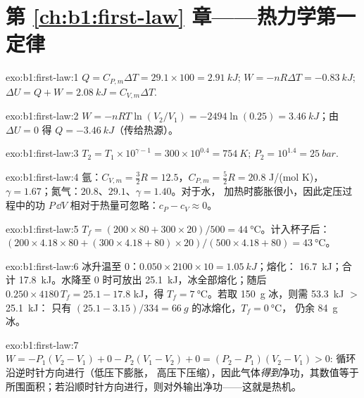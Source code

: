 \section*{第 \ref{ch:b1:first-law} 章——热力学第一定律}

\begin{solution}{exo:b1:first-law:1}
$Q = C_{P,m}\Delta T = 29.1 \times 100 = \qty{2.91}{kJ}$; $W = -nR\Delta T =
\qty{-0.83}{kJ}$; $\Delta U = Q + W = \qty{2.08}{kJ} = C_{V,m}\Delta T$.
\end{solution}

\begin{solution}{exo:b1:first-law:2}
$W = -nRT\ln(V_2/V_1) = -2494\ln(0.25) = \qty{+3.46}{kJ}$；由 $\Delta U = 0$ 得
$Q = \qty{-3.46}{kJ}$（传给热源）。
\end{solution}

\begin{solution}{exo:b1:first-law:3}
$T_2 = T_1 \times 10^{\gamma - 1} = 300 \times 10^{0.4} = \qty{754}{K}$; $P_2 =
10^{1.4} = \qty{25}{bar}$.
\end{solution}

\begin{solution}{exo:b1:first-law:4}
氩：$C_{V,m} = \tfrac32 R = 12.5$，$C_{P,m} = \tfrac52 R = 20.8$ J/(mol K)，
$\gamma = 1.67$；氮气：$20.8$、$29.1$、$\gamma = 1.40$。对于水，
加热时膨胀很小，因此定压过程中的功 $P\,\dd V$
相对于热量可忽略：$c_P - c_V \approx 0$。
\end{solution}

\begin{solution}{exo:b1:first-law:5}
$T_f = (200 \times 80 + 300 \times 20)/500 = \qty{44}{\degreeCelsius}$。计入杯子后：
$(200 \times 4.18 \times 80 + (300 \times 4.18 + 80) \times 20)/(500 \times
4.18 + 80) = \qty{43}{\degreeCelsius}$。
\end{solution}

\begin{solution}{exo:b1:first-law:6}
冰升温至 $0$：$0.050 \times 2100 \times 10 = \qty{1.05}{kJ}$；熔化：
\qty{16.7}{kJ}；合计 \qty{17.8}{kJ}。水降至
$0$ 时可放出 \qty{25.1}{kJ}，冰全部熔化；随后 $0.250 \times 4180\,T_f = 25.1 - 17.8$ kJ，得 $T_f =
\qty{7}{\degreeCelsius}$。若取 \qty{150}{g} 冰，则需 \qty{53.3}{kJ} $>$ \qty{25.1}{kJ}：
只有 $(25.1 - 3.15)/334 = \qty{66}{g}$ 的冰熔化，$T_f = \qty{0}{\degreeCelsius}$，
仍余 \qty{84}{g} 冰。
\end{solution}

\begin{solution}{exo:b1:first-law:7}
$W = -P_1(V_2 - V_1) + 0 - P_2(V_1 - V_2) + 0 = (P_2 - P_1)(V_2 - V_1) > 0$:
循环沿逆时针方向进行（低压下膨胀，
高压下压缩），因此气体\emph{得到}净功，其数值等于
所围面积；若沿顺时针方向进行，则对外输出净功——这就是热机。
\end{solution}

